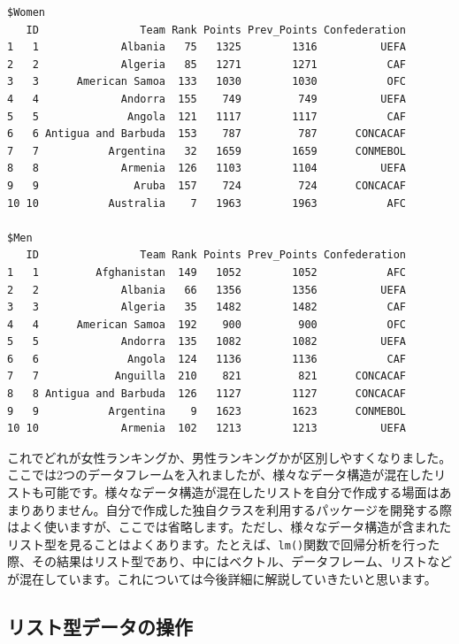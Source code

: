 \documentclass[
  a4paper,
  pandoc,
  ja=standard,
  jafont=haranoaji]{bxjsbook}
\begin{document}
\begin{verbatim}
$Women
   ID                Team Rank Points Prev_Points Confederation
1   1             Albania   75   1325        1316          UEFA
2   2             Algeria   85   1271        1271           CAF
3   3      American Samoa  133   1030        1030           OFC
4   4             Andorra  155    749         749          UEFA
5   5              Angola  121   1117        1117           CAF
6   6 Antigua and Barbuda  153    787         787      CONCACAF
7   7           Argentina   32   1659        1659      CONMEBOL
8   8             Armenia  126   1103        1104          UEFA
9   9               Aruba  157    724         724      CONCACAF
10 10           Australia    7   1963        1963           AFC

$Men
   ID                Team Rank Points Prev_Points Confederation
1   1         Afghanistan  149   1052        1052           AFC
2   2             Albania   66   1356        1356          UEFA
3   3             Algeria   35   1482        1482           CAF
4   4      American Samoa  192    900         900           OFC
5   5             Andorra  135   1082        1082          UEFA
6   6              Angola  124   1136        1136           CAF
7   7            Anguilla  210    821         821      CONCACAF
8   8 Antigua and Barbuda  126   1127        1127      CONCACAF
9   9           Argentina    9   1623        1623      CONMEBOL
10 10             Armenia  102   1213        1213          UEFA
\end{verbatim}

これでどれが女性ランキングか、男性ランキングかが区別しやすくなりました。ここでは2つのデータフレームを入れましたが、様々なデータ構造が混在したリストも可能です。様々なデータ構造が混在したリストを自分で作成する場面はあまりありません。自分で作成した独自クラスを利用するパッケージを開発する際はよく使いますが、ここでは省略します。ただし、様々なデータ構造が含まれたリスト型を見ることはよくあります。たとえば、\texttt{lm()}関数で回帰分析を行った際、その結果はリスト型であり、中にはベクトル、データフレーム、リストなどが混在しています。これについては今後詳細に解説していきたいと思います。

\hypertarget{ux30eaux30b9ux30c8ux578bux30c7ux30fcux30bfux306eux64cdux4f5c}{%
\subsection{リスト型データの操作}\label{ux30eaux30b9ux30c8ux578bux30c7ux30fcux30bfux306eux64cdux4f5c}}
\end{document}
